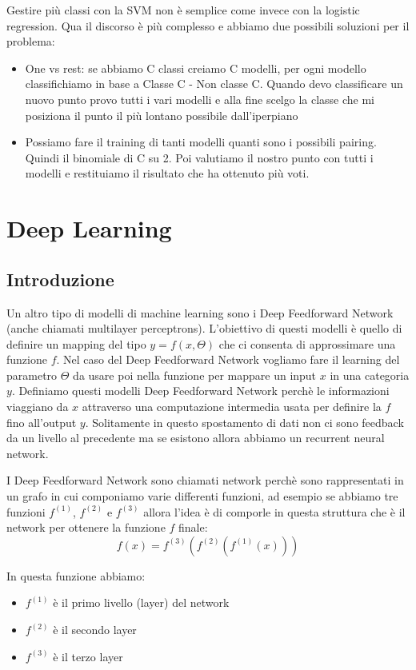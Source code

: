 \documentclass[14pt]{extreport}
\begin{document}
Gestire più classi con la SVM non è semplice come invece con la logistic regression. Qua il discorso è più complesso e abbiamo due possibili soluzioni
per il problema:

\begin{itemize}
\item One vs rest: se abbiamo C classi creiamo C modelli, per ogni modello classifichiamo in base a Classe C - Non classe C. Quando devo classificare
un nuovo punto provo tutti i vari modelli e alla fine scelgo la classe che mi posiziona il punto il più lontano possibile dall'iperpiano
\item Possiamo fare il training di tanti modelli quanti sono i possibili pairing. Quindi il binomiale di C su 2. Poi valutiamo il nostro punto con
tutti i modelli e restituiamo il risultato che ha ottenuto più voti.
\end{itemize}



\chapter{Deep Learning}

\section{Introduzione}

Un altro tipo di modelli di machine learning sono i Deep Feedforward Network (anche chiamati multilayer perceptrons). L'obiettivo di questi modelli è
quello di definire un mapping del tipo $y = f(x, \Theta)$ che ci consenta di approssimare una funzione $f$. Nel caso del Deep Feedforward Network
vogliamo fare il learning del parametro $\Theta$ da usare poi nella funzione per mappare un input $x$ in una categoria $y$. Definiamo questi modelli
Deep Feedforward Network perchè le informazioni viaggiano da $x$ attraverso una computazione intermedia usata per definire la $f$ fino all'output $y$.
Solitamente in questo spostamento di dati non ci sono feedback da un livello al precedente ma se esistono allora abbiamo un recurrent neural network.

I Deep Feedforward Network sono chiamati network perchè sono rappresentati in un grafo in cui componiamo varie differenti funzioni, ad esempio se
abbiamo tre funzioni $f^(1)$, $f^(2)$ e $f^(3)$ allora l'idea è di comporle in questa struttura che è il network per ottenere la funzione $f$ finale:
$$f(x) = f^(3)(f^(2)(f^(1)(x)))$$

In questa funzione abbiamo:
\begin{itemize}
\item $f^(1)$ è il primo livello (layer) del network
\item $f^(2)$ è il secondo layer
\item $f^(3)$ è il terzo layer
\end{itemize}
\end{document}
